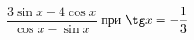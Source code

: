 \begin{ex}[type=simplify_calculate]
	\begin{condition}
		\( \dfrac{3\sin x+4\cos x}{\cos x-\sin x} \) при \( \tg x=-\dfrac{1}{3} \)
	\end{condition}
\end{ex}